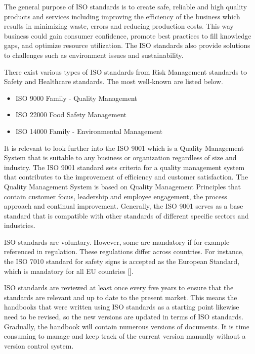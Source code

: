 The general purpose of ISO standards is to create safe, reliable and high quality products and services including improving the efficiency of the business which results in minimizing waste, errors and reducing production costs. This way business could gain consumer confidence, promote best practices to fill knowledge gaps, and optimize resource utilization. The ISO standards also provide solutions to challenges such as environment issues and sustainability.

There exist various types of ISO standards from Risk Management standards to Safety and Healthcare standards. The most well-known are listed below.

\begin{itemize}
	\item ISO 9000 Family - Quality Management
	\item ISO 22000 Food Safety Management
	\item ISO 14000 Family - Environmental Management
\end{itemize}

It is relevant to look further into the ISO 9001 which is a Quality Management System that is suitable to any business or organization regardless of size and industry. The ISO 9001 standard sets criteria for a quality management system that contributes to the improvement of efficiency and customer satisfaction. The Quality Management System is based on Quality Management Principles that contain customer focus, leadership and employee engagement, the process approach and continual improvement. Generally, the ISO 9001 serves as a base standard that is compatible with other standards of different specific sectors and industries.

ISO standards are voluntary. However, some are mandatory if for example referenced in regulation. These regulations differ across countries. For instance, the ISO 7010 standard for safety signs is accepted as the European Standard, which is mandatory for all EU countries [].

ISO standards are reviewed at least once every five years to ensure that the standards are relevant and up to date to the present market. This means the handbooks that were written using ISO standards as a starting point likewise need to be revised, so the new versions are updated in terms of ISO standards. Gradually, the handbook will contain numerous versions of documents. It is time consuming to manage and keep track of the current version manually without a version control system.

